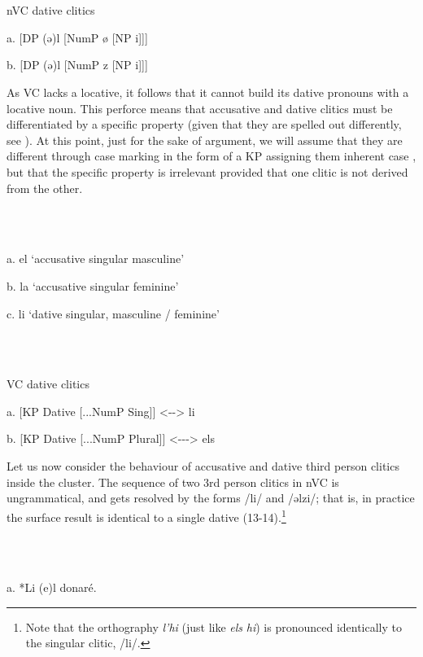 \documentclass[output=paper,modfonts,nonflat]{langsci/langscibook}
\begin{document}
\ea%
    \label{ex:key:10}
    \gll\\
        \\
    \glt
    \z

          nVC dative clitics

  a. [DP  (ǝ)l  [NumP  ø  [NP  i]]]

  b. [DP  (ǝ)l  [NumP  z  [NP  i]]]

As VC lacks a locative, it follows that it cannot build its dative pronouns with a locative noun. This perforce means that accusative and dative clitics must be differentiated by a specific property (given that they are spelled out differently, see ). At this point, just for the sake of argument, we will assume that they are different through case marking in the form of a KP assigning them inherent case , but that the specific property is irrelevant provided that one clitic is not derived from the other.

\ea%
    \label{ex:key:11}
    \gll\\
        \\
    \glt
    \z

           a. el ‘accusative singular masculine’

   b. la ‘accusative singular feminine’

   c. li ‘dative singular, masculine / feminine’ 

\ea%
    \label{ex:key:12}
    \gll\\
        \\
    \glt
    \z

         VC dative clitics

  a. [KP  Dative   [...NumP Sing]]   <-{}-> li

  b. [KP Dative   [...NumP Plural]]  <-{}-{}-> els    

Let us now consider the behaviour of accusative and dative third person clitics inside the cluster. The sequence of two 3rd person clitics in nVC is ungrammatical, and gets resolved by the forms /li/ and /ǝlzi/; that is, in practice the surface result is identical to a single dative (13-14).\footnote{Note that the orthography \textit{l’hi} (just like \textit{els} \textit{hi}) is pronounced identically to the singular clitic, /li/.} 

\ea%
    \label{ex:key:13}
    \gll\\
        \\
    \glt
    \z

         a. *Li     (e)l     donaré.
\end{document}
